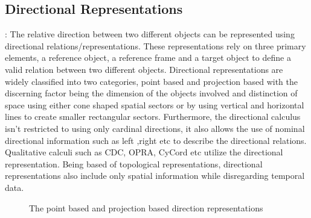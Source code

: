 		\subsection{Directional Representations} \cite{chen2015survey} : The relative direction between two different objects can be represented using directional relations/representations. These representations rely on three primary elements, a reference object, a reference frame and a target object to define a valid relation between two different objects. Directional representations are widely classified into two categories, point based and projection based with the discerning factor being the dimension of the objects involved and distinction of space using either cone shaped spatial sectors or by using vertical and horizontal lines to create smaller rectangular sectors. Furthermore, the directional calculus isn't restricted to using only cardinal directions, it also allows the use of nominal directional information such as left ,right etc to describe the directional relations. Qualitative calculi such as CDC, OPRA, CyCord etc utilize the directional representation. Being based of topological representations, directional representations also include only spatial information while disregarding temporal data.
		
		\begin{figure}[h!]%
			\centering
			\qquad
			\caption{The point based and projection based direction representations \cite{bibid}}%
			\label{fig:example}%
		\end{figure}
	
